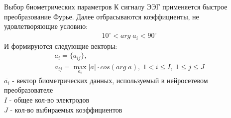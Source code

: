 \begin{frame}{Выбор биометрических параметров}
	К сигналу ЭЭГ применяется быстрое преобразование Фурье.
	Далее отбрасываются коэффициенты, не удовлетворяющие условию:
	\begin{gather*}
		10^{\circ} < arg \; a_i < 90^{\circ}
	\end{gather*}
	И формируются следующие векторы:
	\begin{gather*}
		\overline{a_i} = \{ a_{ij} \}, \\
		a_{ij} = \max_{a_i}|a| \cdot cos(arg \; a),\; 1 < i \leq I,\; 1 \leq j \leq J
	\end{gather*}
	$\overline{a_i}$ - вектор биометрических данных, используемый в нейросетевом преобразователе \\
	$I$ - общее кол-во электродов \\
	$J$ - кол-во выбираемых коэффициентов
\end{frame}
